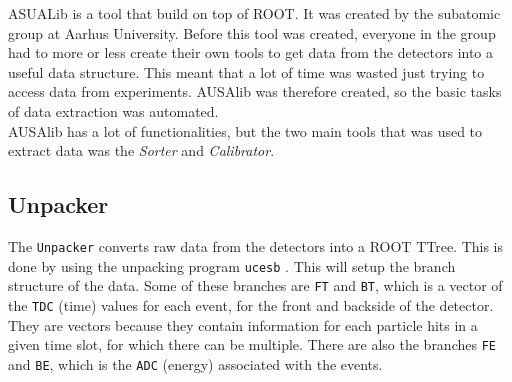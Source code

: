 ASUALib \cite{AUSA} is a tool that build on top of ROOT. It was created by the subatomic group at Aarhus University.
Before this tool was created, everyone in the group had to more or less create their own tools to get data from the detectors into a useful data structure. This meant that a lot of time was wasted just trying to access data from experiments. AUSAlib was therefore created, so the basic tasks of data extraction was automated. \\
AUSAlib has a lot of functionalities, but the two main tools that was used to extract data was the \textit{Sorter} and \textit{Calibrator}.

\subsection{Unpacker}
The \texttt{Unpacker} converts raw data from the detectors into a ROOT TTree. This is done by using the unpacking program \texttt{ucesb} \cite{ucesb}. This will setup the branch structure of the data. Some of these branches are \texttt{FT} and \texttt{BT}, which is a vector of the  \texttt{TDC} (time) values for each event, for the front and backside of the detector. They are vectors because they contain information for each particle hits in a given time slot, for which there can be multiple. 
There are also the branches \texttt{FE} and \texttt{BE}, which is the \texttt{ADC} (energy) associated with the events. 

